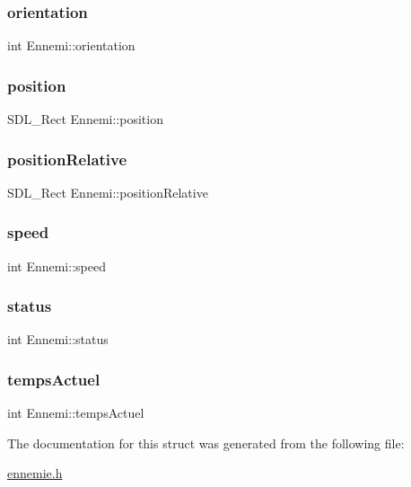 \subsubsection{\texorpdfstring{orientation}{orientation}}
{\footnotesize\ttfamily int Ennemi\+::orientation}

\mbox{\label{structEnnemi_aa31d169528ee729764721ae9f258fcd7}} 
\subsubsection{\texorpdfstring{position}{position}}
{\footnotesize\ttfamily S\+D\+L\+\_\+\+Rect Ennemi\+::position}

\mbox{\label{structEnnemi_a1c9518d04c63608aad25209c8cd1d30f}} 
\subsubsection{\texorpdfstring{positionRelative}{positionRelative}}
{\footnotesize\ttfamily S\+D\+L\+\_\+\+Rect Ennemi\+::position\+Relative}

\mbox{\label{structEnnemi_abf051ea1d034df4a8b0480e9387f2008}} 
\subsubsection{\texorpdfstring{speed}{speed}}
{\footnotesize\ttfamily int Ennemi\+::speed}

\mbox{\label{structEnnemi_a9d03b2261bd09c34c8f44051edd7c164}} 
\subsubsection{\texorpdfstring{status}{status}}
{\footnotesize\ttfamily int Ennemi\+::status}

\mbox{\label{structEnnemi_a30695691f611dc8bc64be42df6f23b40}} 
\subsubsection{\texorpdfstring{tempsActuel}{tempsActuel}}
{\footnotesize\ttfamily int Ennemi\+::temps\+Actuel}



The documentation for this struct was generated from the following file\+:\begin{DoxyCompactItemize}
\item 
\mbox{\hyperlink{ennemie_8h}{ennemie.\+h}}\end{DoxyCompactItemize}

